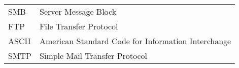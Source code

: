 
\seznamzkr

\begin{tabular}{ll}
	SMB		& Server Message Block\\	
	FTP		& File Transfer Protocol\\
	ASCII	& American Standard Code for Information Interchange\\
	SMTP		& Simple Mail Transfer Protocol\\

\end{tabular}

